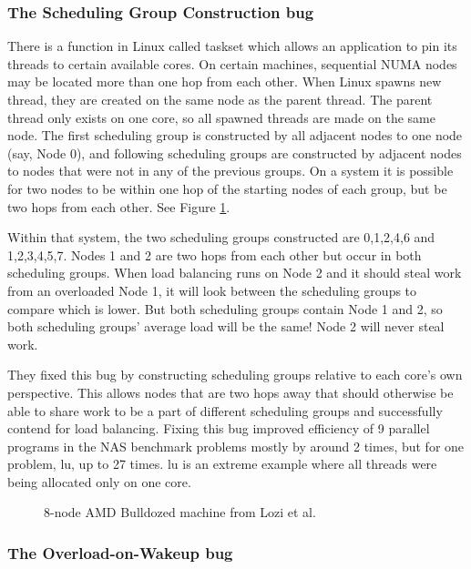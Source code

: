 \documentclass{sig-alternate}
\begin{document}
\subsubsection{The Scheduling Group Construction bug}
\label{sec:cfsfault_grpconstruct}

There is a function in Linux called taskset which allows an application to pin its threads to certain available cores. On certain machines, sequential NUMA nodes may be located more than one hop from each other. When Linux spawns new thread, they are created on the same node as the parent thread. The parent thread only exists on one core, so all spawned threads are made on the same node. The first scheduling group is constructed by all adjacent nodes to one node (say, Node 0), and following scheduling groups are constructed by adjacent nodes to nodes that were not in any of the previous groups. On a system it is possible for two nodes to be within one hop of the starting nodes of each group, but be two hops from each other. See Figure \ref{fig:cfs_schedgroups}.~\cite{Lozi:2016}

Within that system, the two scheduling groups constructed are {0,1,2,4,6} and {1,2,3,4,5,7}. Nodes 1 and 2 are two hops from each other but occur in both scheduling groups. When load balancing runs on Node 2 and it should steal work from an overloaded Node 1, it will look between the scheduling groups to compare which is lower. But both scheduling groups contain Node 1 and 2, so both scheduling groups' average load will be the same! Node 2 will never steal work.~\cite{Lozi:2016}

They fixed this bug by constructing scheduling groups relative to each core's own perspective. This allows nodes that are two hops away that should otherwise be able to share work to be a part of different scheduling groups and successfully contend for load balancing. Fixing this bug improved efficiency of 9 parallel programs in the NAS benchmark problems mostly by around 2 times, but for one problem, lu, up to 27 times. lu is an extreme example where all threads were being allocated only on one core.~\cite{Lozi:2016}

\begin{figure}
\centering
{}
\caption{8-node AMD Bulldozed machine from Lozi et al.~\cite{Lozi:2016}}
\label{fig:cfs_schedgroups}
\end{figure}

\subsubsection{The Overload-on-Wakeup bug}
\label{sec:cfsfault_overload}
\end{document}
